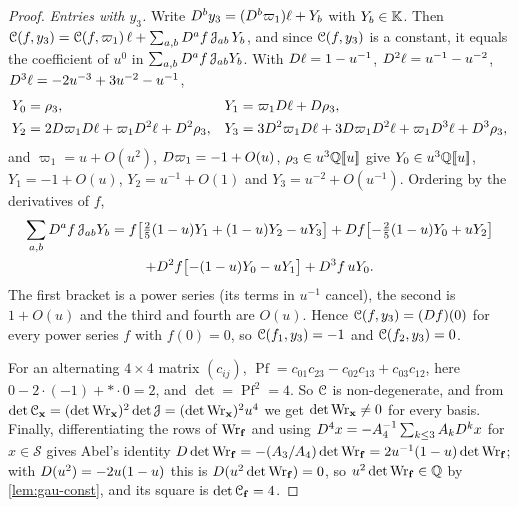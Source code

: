 \begin{proof}
\emph{Entries with $y_3$.} Write $D^by_3=(D^b\varpi_1)\ell+Y_b$ with $Y_b\in\mathbb{K}$. Then $\mathcal{C}(f,y_3)=\mathcal{C}(f,\varpi_1)\,\ell+\sum_{a,b}D^af\,\mathcal{J}_{ab}\,Y_b$, and since $\mathcal{C}(f,y_3)$ is a constant, it equals the coefficient of $u^0$ in $\sum_{a,b}D^af\,\mathcal{J}_{ab}Y_b$. With $D\ell=1-u^{-1}$, $D^2\ell=u^{-1}-u^{-2}$, $D^3\ell=-2u^{-3}+3u^{-2}-u^{-1}$,
\begin{align*}
Y_0&=\rho_3, & Y_1&=\varpi_1D\ell+D\rho_3,\\
Y_2&=2D\varpi_1D\ell+\varpi_1D^2\ell+D^2\rho_3, & Y_3&=3D^2\varpi_1D\ell+3D\varpi_1D^2\ell+\varpi_1D^3\ell+D^3\rho_3,
\end{align*}
and $\varpi_1=u+O(u^2)$, $D\varpi_1=-1+O(u)$, $\rho_3\in u^3\mathbb{Q}[\![ u ]\!]$ give $Y_0\in u^3\mathbb{Q}[\![ u ]\!]$, $Y_1=-1+O(u)$, $Y_2=u^{-1}+O(1)$ and $Y_3=u^{-2}+O(u^{-1})$. Ordering by the derivatives of $f$,
\begin{multline*}
\sum_{a,b}D^af\,\mathcal{J}_{ab}Y_b=f\bigl[\tfrac25(1-u)Y_1+(1-u)Y_2-uY_3\bigr]+D f\bigl[-\tfrac25(1-u)Y_0+uY_2\bigr]\\
+D^2f\bigl[-(1-u)Y_0-uY_1\bigr]+D^3f\,uY_0 .
\end{multline*}
The first bracket is a power series (its terms in $u^{-1}$ cancel), the second is $1+O(u)$ and the third and fourth are $O(u)$. Hence $\mathcal{C}(f,y_3)=(D f)(0)$ for every power series $f$ with $f(0)=0$, so $\mathcal{C}(f_1,y_3)=-1$ and $\mathcal{C}(f_2,y_3)=0$.

For an alternating $4\times4$ matrix $(c_{ij})$, $\operatorname{Pf}=c_{01}c_{23}-c_{02}c_{13}+c_{03}c_{12}$, here $0-2\cdot(-1)+\ast\cdot0=2$, and $\det=\operatorname{Pf}^2=4$. So $\mathcal{C}$ is non-degenerate, and from $\det\mathcal{C}_{\mathbf x}=(\det\operatorname{Wr}_{\mathbf x})^2\det\mathcal{J}=(\det\operatorname{Wr}_{\mathbf x})^2u^4$ we get $\det\operatorname{Wr}_{\mathbf x}\neq0$ for every basis. Finally, differentiating the rows of $\operatorname{Wr}_{\mathbf f}$ and using $D^4x=-A_4^{-1}\sum_{k\leq3}A_kD^kx$ for $x\in\mathcal S$ gives Abel's identity $D\det\operatorname{Wr}_{\mathbf f}=-(A_3/A_4)\det\operatorname{Wr}_{\mathbf f}=2u^{-1}(1-u)\det\operatorname{Wr}_{\mathbf f}$; with $D(u^2)=-2u(1-u)$ this is $D(u^2\det\operatorname{Wr}_{\mathbf f})=0$, so $u^2\det\operatorname{Wr}_{\mathbf f}\in\mathbb{Q}$ by \cref{lem:gau-const}, and its square is $\det\mathcal{C}_{\mathbf f}=4$.
\end{proof}


